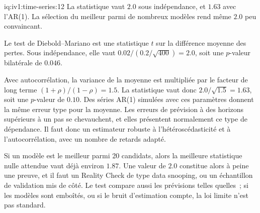 \begin{solution}{iq:iv1:time-series:12}
La statistique vaut $2.0$ sous indépendance, et $1.63$ avec l'AR(1). La sélection du meilleur parmi de nombreux modèles rend même $2.0$ peu convaincant.

Le test de Diebold--Mariano est une statistique $t$ sur la différence moyenne des pertes. Sous indépendance, elle vaut $0.02/(0.2/\sqrt{400}) = 2.0$, soit une $p$-valeur bilatérale de $0.046$.

Avec autocorrélation, la variance de la moyenne est multipliée par le facteur de long terme $(1 + \rho)/(1 - \rho) = 1.5$. La statistique vaut donc $2.0/\sqrt{1.5} = 1.63$, soit une $p$-valeur de $0.10$. Des séries AR(1) simulées avec ces paramètres donnent la même erreur type pour la moyenne. Les erreurs de prévision à des horizons supérieurs à un pas se chevauchent, et elles présentent normalement ce type de dépendance. Il faut donc un estimateur robuste à l'hétéroscédasticité et à l'autocorrélation, avec un nombre de retards adapté.

Si un modèle est le meilleur parmi 20 candidats, alors la meilleure statistique nulle attendue vaut déjà environ $1.87$. Une valeur de $2.0$ constitue alors à peine une preuve, et il faut un Reality Check de type data snooping, ou un échantillon de validation mis de côté. Le test compare aussi les prévisions telles quelles~; si les modèles sont emboîtés, ou si le bruit d'estimation compte, la loi limite n'est pas standard.



\end{solution}

